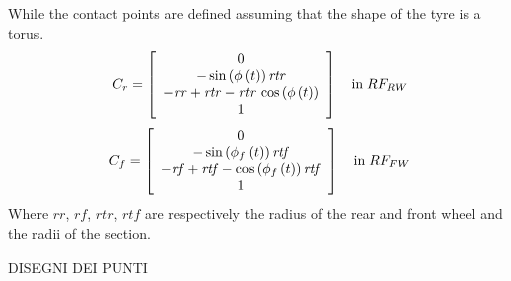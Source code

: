 %
While the contact points are defined assuming that the shape of the tyre is a torus. 
%
\begin{equation}
C_r =  \left[ \begin {array}{c} 0\\ 
-\sin \left( \phi
\left( t \right)  \right) {\it rtr}\\ 
-{\it rr}+{
\it rtr}-{\it rtr}\,\cos \left( \phi \left( t \right)  \right)\\ 
1\end {array} \right] 
\quad \text{in} \; RF_{RW}
\end{equation}
%
\begin{equation}
C_f =  \left[ \begin {array}{c} 0\\ 
-\sin \left( \phi_{f}
\left( t \right)  \right) {\it rtf}\\ 
-{\it rf}+{
\it rtf}-\cos \left( \phi_{f} \left( t \right)  \right) {\it rtf}\\
1\end {array} \right] 
\quad \text{in} \; RF_{FW}
\end{equation}
%
Where $rr$, $rf$, $rtr$, $rtf$ are respectively the radius of the rear and front wheel and the radii of the section.
%

DISEGNI DEI PUNTI %

